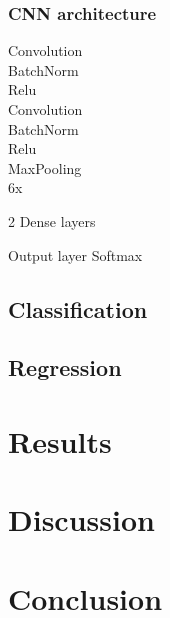 \documentclass[12pt]{article}
\begin{document}
\subsubsection{CNN architecture}

Convolution\\
BatchNorm\\
Relu\\
Convolution\\
BatchNorm\\
Relu\\
MaxPooling\\

6x

2 Dense layers

Output layer Softmax

\subsection{Classification}



\subsection{Regression}



\section{Results}


\section{Discussion}


\section{Conclusion}



\newpage
\printbibliography

\newpage
\listoffigures
\end{document}

